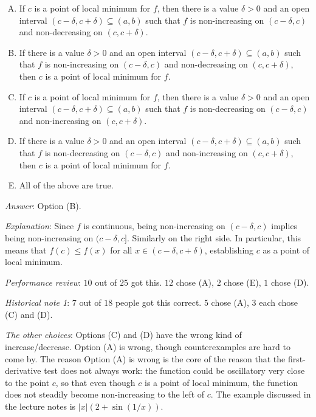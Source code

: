 \documentclass[10pt]{amsart}
\begin{document}
\begin{enumerate}
\begin{enumerate}[(A)]
  \item If $c$ is a point of local minimum for $f$, then there is a
    value $\delta > 0$ and an open interval $(c - \delta, c + \delta)
    \subseteq (a,b)$ such that $f$ is non-increasing on $(c -
    \delta,c)$ and non-decreasing on $(c,c+\delta)$.
  \item If there is a value $\delta > 0$ and an open interval $(c -
    \delta, c + \delta) \subseteq (a,b)$ such that $f$ is
    non-increasing on $(c - \delta,c)$ and non-decreasing on
    $(c,c+\delta)$, then $c$ is a point of local minimum for $f$.
  \item If $c$ is a point of local minimum for $f$, then there is a
    value $\delta > 0$ and an open interval $(c - \delta, c + \delta)
    \subseteq (a,b)$ such that $f$ is non-decreasing on $(c -
    \delta,c)$ and non-increasing on $(c,c+\delta)$.
  \item If there is a value $\delta > 0$ and an open interval $(c -
    \delta, c + \delta) \subseteq (a,b)$ such that $f$ is
    non-decreasing on $(c - \delta,c)$ and non-increasing on
    $(c,c+\delta)$, then $c$ is a point of local minimum for $f$.
  \item All of the above are true.
  \end{enumerate}

  {\em Answer}: Option (B).

  {\em Explanation}: Since $f$ is continuous, being non-increasing on
  $(c - \delta, c)$ implies being non-increasing on $(c -
  \delta,c]$. Similarly on the right side. In particular, this means
  that $f(c) \le f(x)$ for all $x \in (c - \delta, c + \delta)$,
  establishing $c$ as a point of local minimum.

  {\em Performance review}: $10$ out of $25$ got this. $12$ chose (A),
  $2$ chose (E), $1$ chose (D).

  {\em Historical note 1}: $7$ out of $18$ people got this
  correct. $5$ chose (A), $3$ each chose (C) and (D).

  {\em The other choices}: Options (C) and (D)
  have the wrong kind of increase/decrease. Option (A) is wrong,
  though counterexamples are hard to come by. The reason Option (A) is
  wrong is the core of the reason that the first-derivative test does
  not always work: the function could be oscillatory very close to the
  point $c$, so that even though $c$ is a point of local minimum, the
  function does not steadily become non-increasing to the left of
  $c$. The example discussed in the lecture notes is $|x|(2 +
  \sin(1/x))$.


\end{enumerate}
\end{document}
